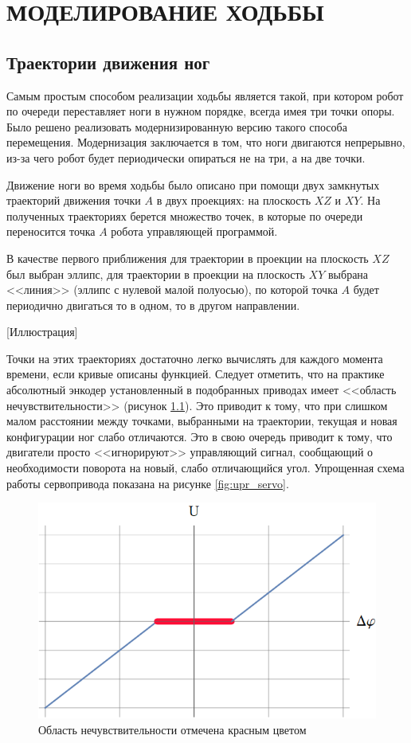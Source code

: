 \chapter{\MakeUppercase{Моделирование ходьбы}}
\section{Траектории движения ног}

Самым простым способом реализации ходьбы является такой, при котором робот по очереди переставляет ноги в нужном порядке, всегда имея три точки опоры. Было решено реализовать модернизированную версию такого способа перемещения. Модернизация заключается в том, что ноги двигаются непрерывно, из-за чего робот будет периодически опираться не на три, а на две точки.

Движение ноги во время ходьбы было описано при помощи двух замкнутых траекторий движения точки $ A $ в двух проекциях: на плоскость $ XZ $ и $ XY $. На полученных траекториях берется множество точек, в которые по очереди переносится точка $A$ робота управляющей программой.

В качестве первого приближения для траектории в проекции на плоскость $ XZ $ был выбран эллипс, для траектории в проекции на плоскость $ XY $ выбрана <<линия>> (эллипс с нулевой малой полуосью), по которой точка $ A $ будет периодично двигаться то в одном, то в другом направлении.

[Иллюстрация]

Точки на этих траекториях достаточно легко вычислять для каждого момента времени, если кривые описаны функцией. Следует отметить, что на практике абсолютный энкодер установленный в подобранных приводах имеет <<область нечувствительности>> (рисунок \ref{fig:nonff}). Это приводит к тому, что при слишком малом расстоянии между точками, выбранными на траектории, текущая и новая конфигурации ног слабо отличаются. Это в свою очередь приводит к тому, что двигатели просто <<игнорируют>> управляющий сигнал, сообщающий о необходимости поворота на новый, слабо отличающийся угол. Упрощенная схема работы сервопривода показана на рисунке \ref{fig:upr_servo}.

\begin{figure}[h]
    \centering
    \includegraphics[scale=0.6]{chapter_walking_model/figure2.png}
    \caption{Область нечувствительности отмечена красным цветом}
    \label{fig:nonff}
\end{figure}

